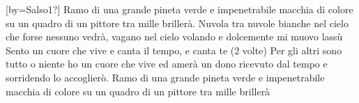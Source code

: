 [by={Salso1?}]
\beginverse
Ramo di una grande pineta verde e impenetrabile
macchia di colore su un quadro
di un pittore tra mille brillerà.
\endverse \beginverse
Nuvola tra nuvole bianche nel cielo
che forse nessuno vedrà,
vagano nel cielo volando
e dolcemente mi muovo lassù
\endverse
\beginchorus
Sento un cuore che vive
e canta il tempo, e canta te (2 volte)
\endchorus
\beginverse
Per gli altri sono tutto o niente 
ho un cuore che vive ed amerà
un dono ricevuto dal tempo
e sorridendo lo accoglierò.
\endverse \beginverse
Ramo di una grande pineta verde e impenetrabile
macchia di colore su un quadro
di un pittore tra mille brillerà
\endverse
\endsong
